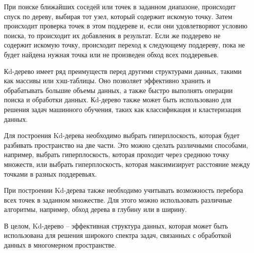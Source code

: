 При поиске ближайших соседей или точек в заданном диапазоне, происходит спуск по дереву, выбирая тот узел, который содержит искомую точку. Затем происходит проверка точек в этом поддереве и, если они удовлетворяют условию поиска, то происходит их добавленик в результат. Если же поддерево не содержит искомую точку, происходит переход к следующему поддереву, пока не будет найдена нужная точка или не произведен обход всех поддеревьев.

Кd-дерево имеет ряд преимуществ перед другими структурами данных, такими как массивы или хэш-таблицы. Оно позволяет эффективно хранить и обрабатывать большие объемы данных, а также быстро выполнять операции поиска и обработки данных. Кd-дерево также может быть использовано для решения задач машинного обучения, таких как классификация и кластеризация данных.

Для построения Kd-дерева необходимо выбрать гиперплоскость, которая будет разбивать пространство на две части. Это можно сделать различными способами, например, выбрать гиперплоскость, которая проходит через среднюю точку множеств, или выбрать гиперплоскость, которая максимизирует расстояние между точками в разных поддеревьях.

При построении Kd-дерева также необходимо учитывать возможность перебора всех точек в заданном множестве. Для этого можно использовать различные алгоритмы, например, обход дерева в глубину или в ширину.

В целом, Kd-дерево -- эффективная структура данных, которая может быть использована для решения широкого спектра задач, связанных с обработкой данных в многомерном пространстве.